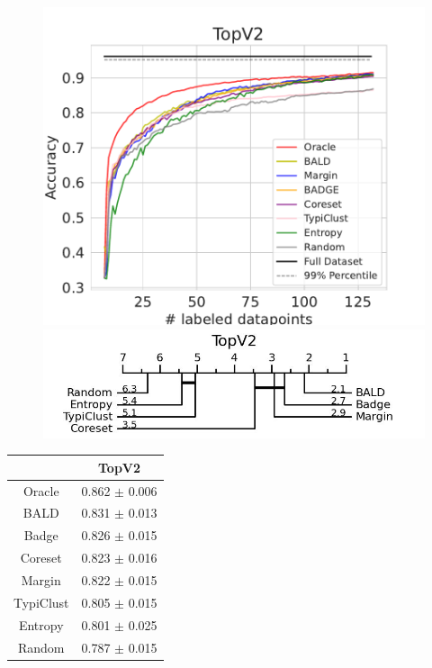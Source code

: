 \documentclass[]{article}
\begin{document}
\begin{minipage}{0.65\linewidth}
\begin{figure}[H]
    \centering
\includegraphics[width=\linewidth]{img/eval_topv2} \\[2mm]
\includegraphics[width=\linewidth]{img/micro_topv2.jpg}
\end{figure}
\end{minipage}
\begin{minipage}{0.29\linewidth}
\begin{tabular}{c|c}
&TopV2\\
\hline
Oracle&0.862 $\pm$ 0.006\\
BALD&0.831 $\pm$ 0.013\\
Badge&0.826 $\pm$ 0.015\\
Coreset&0.823 $\pm$ 0.016\\
Margin&0.822 $\pm$ 0.015\\
TypiClust&0.805 $\pm$ 0.015\\
Entropy&0.801 $\pm$ 0.025\\
Random&0.787 $\pm$ 0.015\\
\end{tabular}
\end{minipage}
\end{document}
